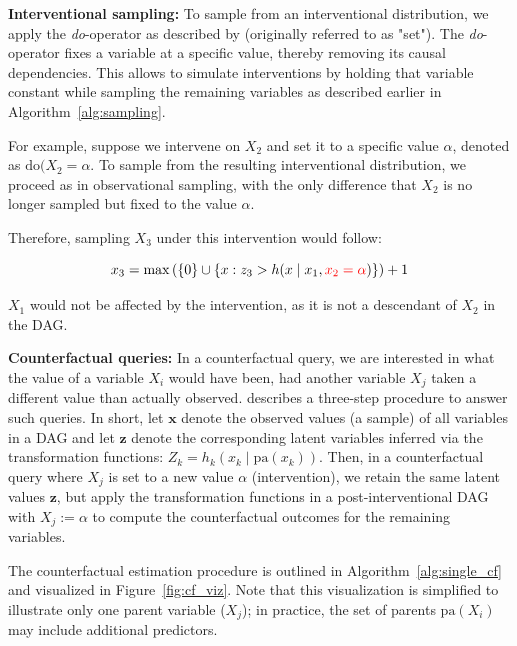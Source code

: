 \textbf{Interventional sampling:} To sample from an interventional distribution, we apply the \textit{do}-operator as described by \citet{pearl1995} (originally referred to as "set"). The \textit{do}-operator fixes a variable at a specific value, thereby removing its causal dependencies. This allows to simulate interventions by holding that variable constant while sampling the remaining variables as described earlier in Algorithm~\ref{alg:sampling}.

For example, suppose we intervene on $X_2$ and set it to a specific value $\alpha$, denoted as $\text{do}(X_2 = \alpha$. To sample from the resulting interventional distribution, we proceed as in observational sampling, with the only difference that $X_2$ is no longer sampled but fixed to the value $\alpha$.

Therefore, sampling $X_3$ under this intervention would follow:

\[
x_3 = \max \left( \{0\} \cup \left\{ x : z_3 > h(x \mid x_1, \textcolor{red}{x_2 = \alpha}) \right\} \right) + 1
\]

$X_1$ would not be affected by the intervention, as it is not a descendant of $X_2$ in the DAG. 



\textbf{Counterfactual queries:} In a counterfactual query, we are interested in what the value of a variable $X_i$ would have been, had another variable $X_j$ taken a different value than actually observed. \citet{pearl_book2009} describes a three-step procedure to answer such queries. In short, let $\mathbf{x}$ denote the observed values (a sample) of all variables in a DAG and let $\mathbf{z}$ denote the corresponding latent variables inferred via the transformation functions: $Z_k = h_k(x_k \mid \text{pa}(x_k))$. Then, in a counterfactual query where $X_j$ is set to a new value $\alpha$ (intervention), we retain the same latent values $\mathbf{z}$, but apply the transformation functions in a post-interventional DAG with $X_j := \alpha$ to compute the counterfactual outcomes for the remaining variables.

The counterfactual estimation procedure is outlined in Algorithm~\ref{alg:single_cf} and visualized in Figure~\ref{fig:cf_viz}. Note that this visualization is simplified to illustrate only one parent variable ($X_j$); in practice, the set of parents $\text{pa}(X_i)$ may include additional predictors.

